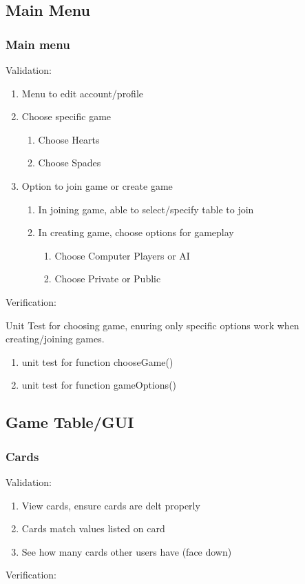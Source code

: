 \documentclass[11pt, titlepage]{article}
\begin{document}
		\subsection{Main Menu}
			\subsubsection{Main menu}
			Validation:
				\begin{enumerate}
					\item Menu to edit account/profile
					\item Choose specific game
					\begin{enumerate}
						\item Choose Hearts
						\item Choose Spades
					\end{enumerate}
					\item Option to join game or create game
					\begin{enumerate}
						 \item In joining game, able to select/specify table to join
						 \item In creating game, choose options for gameplay
						 \begin{enumerate}
						 	\item Choose Computer Players or AI
						 	\item Choose Private or Public
						 \end{enumerate}
					\end{enumerate}
				\end{enumerate}
			Verification:
			
			Unit Test for choosing game, enuring only specific options work when creating/joining games.
			\begin{enumerate}
				\item unit test for function chooseGame()
				\item unit test for function gameOptions()		
			\end{enumerate}
		\subsection{Game Table/GUI}
			\subsubsection{Cards}
			Validation:
			\begin{enumerate}
				\item View  cards, ensure cards are delt properly
				\item Cards match values listed on card
				\item See how many cards other users have (face down) 
			\end{enumerate}
			Verification:
			
\end{document}
